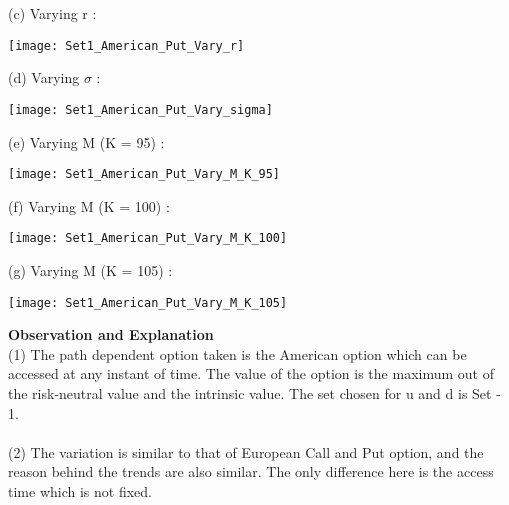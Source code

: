 \documentclass{article}
\begin{document}
(c) Varying r :
\begin{center}
\texttt{[image: Set1\_American\_Put\_Vary\_r]}
\end{center}

(d) Varying $\sigma$ :
\begin{center}
\texttt{[image: Set1\_American\_Put\_Vary\_sigma]}\\
\end{center}
\newpage
(e) Varying M (K = 95) :
\begin{center}
\texttt{[image: Set1\_American\_Put\_Vary\_M\_K\_95]}
\end{center}

(f) Varying M (K = 100) :
\begin{center}
\texttt{[image: Set1\_American\_Put\_Vary\_M\_K\_100]}\\
\end{center}

(g) Varying M (K = 105) :
\begin{center}
\texttt{[image: Set1\_American\_Put\_Vary\_M\_K\_105]}
\end{center}
\newpage
\textbf{Observation and Explanation}\\
(1) The path dependent option taken is the American option which can be accessed at any instant of time. The value of the option is the maximum out of the risk-neutral value and the intrinsic value. The set chosen for u and d is Set - 1.\\\\
(2) The variation is similar to that of European Call and Put option, and the reason behind the trends are also similar. The only difference here is the access time which is not fixed.
\end{document}
